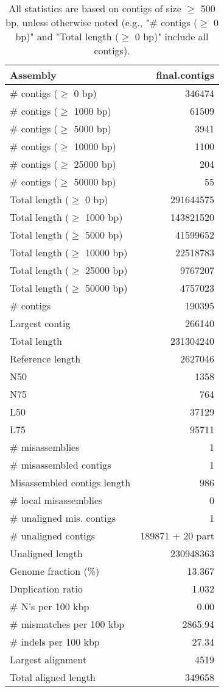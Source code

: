 \documentclass[12pt,a4paper]{article}
\begin{document}
\begin{table}[ht]
\begin{center}
\caption{All statistics are based on contigs of size $\geq$ 500 bp, unless otherwise noted (e.g., "\# contigs ($\geq$ 0 bp)" and "Total length ($\geq$ 0 bp)" include all contigs).}
\begin{tabular}{|l*{1}{|r}|}
\hline
Assembly & final.contigs \\ \hline
\# contigs ($\geq$ 0 bp) & 346474 \\ \hline
\# contigs ($\geq$ 1000 bp) & 61509 \\ \hline
\# contigs ($\geq$ 5000 bp) & 3941 \\ \hline
\# contigs ($\geq$ 10000 bp) & 1100 \\ \hline
\# contigs ($\geq$ 25000 bp) & 204 \\ \hline
\# contigs ($\geq$ 50000 bp) & 55 \\ \hline
Total length ($\geq$ 0 bp) & 291644575 \\ \hline
Total length ($\geq$ 1000 bp) & 143821520 \\ \hline
Total length ($\geq$ 5000 bp) & 41599652 \\ \hline
Total length ($\geq$ 10000 bp) & 22518783 \\ \hline
Total length ($\geq$ 25000 bp) & 9767207 \\ \hline
Total length ($\geq$ 50000 bp) & 4757023 \\ \hline
\# contigs & 190395 \\ \hline
Largest contig & 266140 \\ \hline
Total length & 231304240 \\ \hline
Reference length & 2627046 \\ \hline
N50 & 1358 \\ \hline
N75 & 764 \\ \hline
L50 & 37129 \\ \hline
L75 & 95711 \\ \hline
\# misassemblies & 1 \\ \hline
\# misassembled contigs & 1 \\ \hline
Misassembled contigs length & 986 \\ \hline
\# local misassemblies & 0 \\ \hline
\# unaligned mis. contigs & 1 \\ \hline
\# unaligned contigs & 189871 + 20 part \\ \hline
Unaligned length & 230948363 \\ \hline
Genome fraction (\%) & 13.367 \\ \hline
Duplication ratio & 1.032 \\ \hline
\# N's per 100 kbp & 0.00 \\ \hline
\# mismatches per 100 kbp & 2865.94 \\ \hline
\# indels per 100 kbp & 27.34 \\ \hline
Largest alignment & 4519 \\ \hline
Total aligned length & 349658 \\ \hline
\end{tabular}
\end{center}
\end{table}
\end{document}
